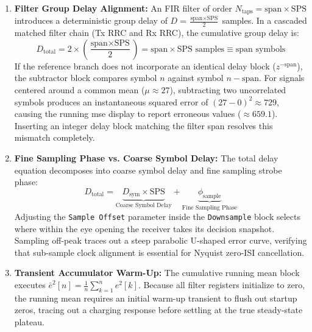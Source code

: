 \documentclass[Markos_Delaportas_1316.tex]{subfiles}
\begin{document}
\begin{enumerate}[leftmargin=*]
    \item \textbf{Filter Group Delay Alignment:} An FIR filter of
        order $N_{\text{taps}} = \text{span} \times \text{SPS}$ introduces
        a deterministic group delay of $D = \frac{\text{span} \times
        \text{SPS}}{2}$ samples. In a cascaded matched filter chain
        (Tx RRC and Rx RRC), the cumulative group delay is:
        \begin{equation}
            D_{\text{total}} = 2 \times \left( \frac{\text{span}
            \times \text{SPS}}{2} \right) = \text{span} \times
            \text{SPS} \text{ samples} \equiv \text{span} \text{ symbols}
            \label{eq:filter_group_delay_cascade}
        \end{equation}
        If the reference branch does not incorporate an identical
        delay block ($z^{-\text{span}}$), the subtractor block compares
        symbol $n$ against symbol $n - \text{span}$. For signals
        centered around a common mean ($\mu \approx 27$), subtracting two
        uncorrelated symbols produces an instantaneous squared error
        of $(27 - 0)^2 \approx 729$, causing the running \gls{mse}
        display to report erroneous values ($\approx 659.1$).
        Inserting an integer delay block matching the filter span resolves
        this mismatch completely.
    \item \textbf{Fine Sampling Phase vs. Coarse Symbol Delay:} The
        total delay equation decomposes into coarse symbol delay
        and fine sampling strobe phase:
        \begin{equation}
            D_{\text{total}} = \underbrace{D_{\text{sym}} \times
            \text{SPS}}_{\text{Coarse Symbol Delay}} +
            \underbrace{\phi_{\text{sample}}}_{\text{Fine Sampling Phase}}
            \label{eq:unified_delay_equation}
        \end{equation}
        Adjusting the \texttt{Sample Offset} parameter inside the
        \texttt{Downsample} block selects where within the eye opening
        the receiver takes its decision snapshot. Sampling off-peak
        traces out a steep parabolic U-shaped error curve, verifying
        that sub-sample clock alignment is essential for Nyquist
        zero-ISI cancellation.
    \item \textbf{Transient Accumulator Warm-Up:} The cumulative
        running mean block executes $\bar{e}^2[n] =
        \frac{1}{n}\sum_{k=1}^n e^2[k]$.
        Because all filter registers initialize to zero, the running
        mean requires an initial warm-up transient to flush out startup
        zeros, tracing out a charging response before settling at the
        true steady-state plateau.
\end{enumerate}
\end{document}
